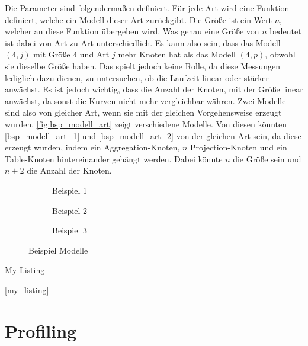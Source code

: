 Die Parameter sind folgendermaßen definiert. Für jede Art wird eine Funktion
definiert, welche ein Modell dieser Art zurückgibt. Die Größe ist ein Wert $n$,
welcher an diese Funktion übergeben wird. Was genau eine Größe von $n$ bedeutet
ist dabei von Art zu Art unterschiedlich. Es kann also sein, dass das Modell
$(4,j)$ mit Größe $4$ und Art $j$ mehr Knoten hat als das Modell $(4,p)$,
obwohl sie dieselbe Größe haben. Das spielt jedoch keine Rolle, da diese
Messungen lediglich dazu dienen, zu untersuchen, ob die Laufzeit linear oder
stärker anwächst. Es ist jedoch wichtig, dass die Anzahl der Knoten, mit der
Größe linear anwächst, da sonst die Kurven nicht mehr vergleichbar währen.
Zwei Modelle sind also von gleicher Art, wenn sie mit der gleichen
Vorgehensweise erzeugt wurden. \autoref{fig:bsp_modell_art} zeigt verschiedene
Modelle. Von diesen könnten \zB \autoref{bsp_modell_art_1} und
\autoref{bsp_modell_art_2} von der gleichen Art sein, da diese erzeugt wurden,
indem ein \foreignlanguage{english}{Aggregation}-Knoten, $n$
\foreignlanguage{english}{Projection}-Knoten und ein
\foreignlanguage{english}{Table}-Knoten hintereinander gehängt werden.
Dabei könnte $n$ die Größe sein und $n+2$ die Anzahl der Knoten.

\begin{figure}
    \begin{subfigure}[b]{0.3\textwidth}
         \caption{Beispiel
        1}\label{bsp_modell_art_1}
    \end{subfigure}
    \begin{subfigure}[b]{0.3\textwidth}
         \caption{Beispiel
        2}\label{bsp_modell_art_2}
    \end{subfigure}
    \begin{subfigure}[b]{0.3\textwidth} 
        \caption{Beispiel 3}\label{bsp_modell_art_3}
    \end{subfigure}
    \caption{Beispiel Modelle}\label{fig:bsp_modell_art}
\end{figure}

\begin{listing}
    
\caption{My Listing}
\label{my_listing}
\end{listing}

\autoref{my_listing}


\section{Profiling}
